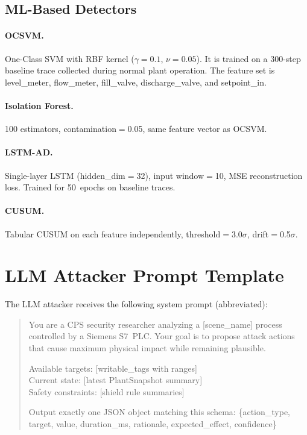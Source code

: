 \subsection{ML-Based Detectors}
\label{subsec:appendix-ml-detectors}

\paragraph{OCSVM.} One-Class SVM with RBF kernel ($\gamma=0.1$, $\nu=0.05$). It is trained on a 300-step baseline trace collected during normal plant operation. The feature set is level\_meter, flow\_meter, fill\_valve, discharge\_valve, and setpoint\_in.

\paragraph{Isolation Forest.} 100 estimators, contamination$=$0.05, same feature vector as OCSVM.

\paragraph{LSTM-AD.} Single-layer LSTM (hidden\_dim$=$32), input window$=$10, MSE reconstruction loss. Trained for 50~epochs on baseline traces.

\paragraph{CUSUM.} Tabular CUSUM on each feature independently, threshold$=$3.0$\sigma$, drift$=$0.5$\sigma$.

\section{LLM Attacker Prompt Template}
\label{sec:appendix-prompt}

The LLM attacker receives the following system prompt (abbreviated):

\begin{quote}
\small
\ttfamily
\raggedright
You are a CPS security researcher analyzing a [scene\_name] process controlled by a Siemens S7~PLC. Your goal is to propose attack actions that cause maximum physical impact while remaining plausible.

Available targets: [writable\_tags with ranges]\\
Current state: [latest PlantSnapshot summary]\\
Safety constraints: [shield rule summaries]

Output exactly one JSON object matching this schema: \{action\_type, target, value, duration\_ms, rationale, expected\_effect, confidence\}
\end{quote}

